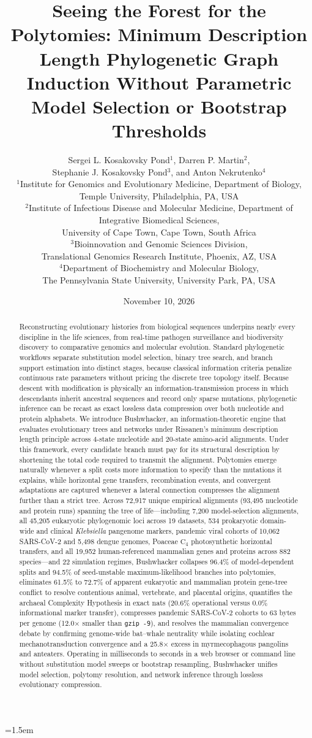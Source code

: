 \documentclass[11pt,a4paper]{article}
\title{Seeing the Forest for the Polytomies: Minimum Description Length Phylogenetic Graph Induction Without Parametric Model Selection or Bootstrap Thresholds}
\author{Sergei L. Kosakovsky Pond$^{1}$, Darren P. Martin$^{2}$,\\
Stephanie J. Kosakovsky Pond$^{3}$, and Anton Nekrutenko$^{4}$\\[0.5em] %
\small $^{1}$Institute for Genomics and Evolutionary Medicine, Department of Biology,\\
\small Temple University, Philadelphia, PA, USA\\
\small $^{2}$Institute of Infectious Disease and Molecular Medicine, Department of Integrative Biomedical Sciences,\\
\small University of Cape Town, Cape Town, South Africa\\
\small $^{3}$Bioinnovation and Genomic Sciences Division,\\
\small Translational Genomics Research Institute, Phoenix, AZ, USA\\
\small $^{4}$Department of Biochemistry and Molecular Biology,\\
\small The Pennsylvania State University, University Park, PA, USA}
\date{November 10, 2026}
\begin{document}
\sloppy
\emergencystretch=1.5em
\maketitle

\begin{abstract}
Reconstructing evolutionary histories from biological sequences underpins nearly every discipline in the life sciences, from real-time pathogen surveillance and biodiversity discovery to comparative genomics and molecular evolution. Standard phylogenetic workflows separate substitution model selection, binary tree search, and branch support estimation into distinct stages, because classical information criteria penalize continuous rate parameters without pricing the discrete tree topology itself. Because descent with modification is physically an information-transmission process in which descendants inherit ancestral sequences and record only sparse mutations, phylogenetic inference can be recast as exact lossless data compression over both nucleotide and protein alphabets. We introduce Bushwhacker, an information-theoretic engine that evaluates evolutionary trees and networks under Rissanen's minimum description length principle across 4-state nucleotide and 20-state amino-acid alignments. Under this framework, every candidate branch must pay for its structural description by shortening the total code required to transmit the alignment. Polytomies emerge naturally whenever a split costs more information to specify than the mutations it explains, while horizontal gene transfers, recombination events, and convergent adaptations are captured whenever a lateral connection compresses the alignment further than a strict tree. Across 72,917 unique empirical alignments (93,495 nucleotide and protein runs) spanning the tree of life---including 7,200 model-selection alignments, all 45,205 eukaryotic phylogenomic loci across 19 datasets, 534 prokaryotic domain-wide and clinical \textit{Klebsiella} pangenome markers, pandemic viral cohorts of 10,062 SARS-CoV-2 and 5,498 dengue genomes, Poaceae $\text{C}_4$ photosynthetic horizontal transfers, and all 19,952 human-referenced mammalian genes and proteins across 882 species---and 22 simulation regimes, Bushwhacker collapses 96.4\% of model-dependent splits and 94.5\% of seed-unstable maximum-likelihood branches into polytomies, eliminates 61.5\% to 72.7\% of apparent eukaryotic and mammalian protein gene-tree conflict to resolve contentious animal, vertebrate, and placental origins, quantifies the archaeal Complexity Hypothesis in exact nats (20.6\% operational versus 0.0\% informational marker transfer), compresses pandemic SARS-CoV-2 cohorts to 63 bytes per genome (12.0$\times$ smaller than \texttt{gzip -9}), and resolves the mammalian convergence debate by confirming genome-wide bat--whale neutrality while isolating cochlear mechanotransduction convergence and a 25.8$\times$ excess in myrmecophagous pangolins and anteaters. Operating in milliseconds to seconds in a web browser or command line without substitution model sweeps or bootstrap resampling, Bushwhacker unifies model selection, polytomy resolution, and network inference through lossless evolutionary compression.
\end{abstract}
\end{document}
